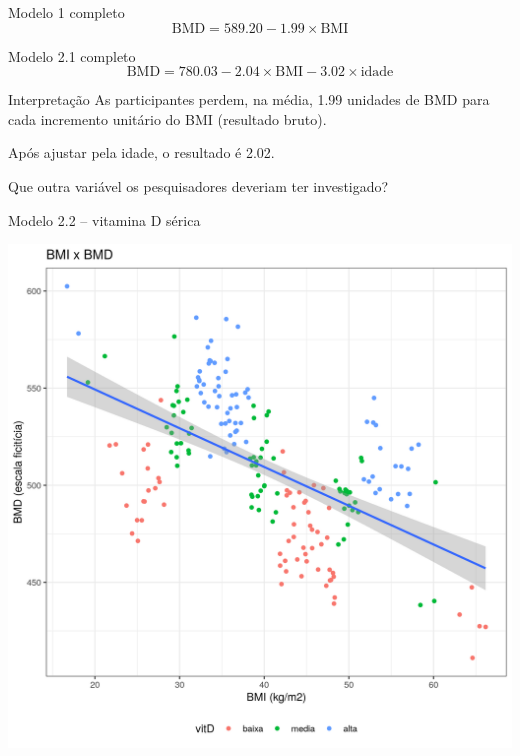 \documentclass{beamer}
\begin{document}
\begin{frame}{\scriptsize }
  \begin{exampleblock}{Modelo 1 completo}
    \tiny
    \begin{displaymath}
      \text{BMD} =589.20 -1.99 \times\text{BMI}
    \end{displaymath}
  \end{exampleblock}
  \begin{exampleblock}{Modelo 2.1 completo}
    \footnotesize
    \begin{displaymath}
      \text{BMD} =780.03 -2.04 \times\text{BMI} -3.02 \times\text{idade}
    \end{displaymath}
  \end{exampleblock}
  \begin{exampleblock}{Interpretação}
    \footnotesize
    As participantes perdem, na média, 1.99 unidades de BMD para cada incremento unitário do BMI (resultado bruto).

    \bigskip
    Após ajustar pela idade, o resultado é 2.02.
  \end{exampleblock}
\end{frame}

\begin{frame}{\scriptsize }
  \begin{center}
    Que outra variável os pesquisadores deveriam ter investigado?
  \end{center}
\end{frame}

\begin{frame}{\scriptsize Modelo 2.2 -- vitamina D sérica}
  \begin{center}
    \includegraphics[height=.9\textheight]{Cap31-32/pratica-rlm2_2}
  \end{center}
\end{frame}
\end{document}
